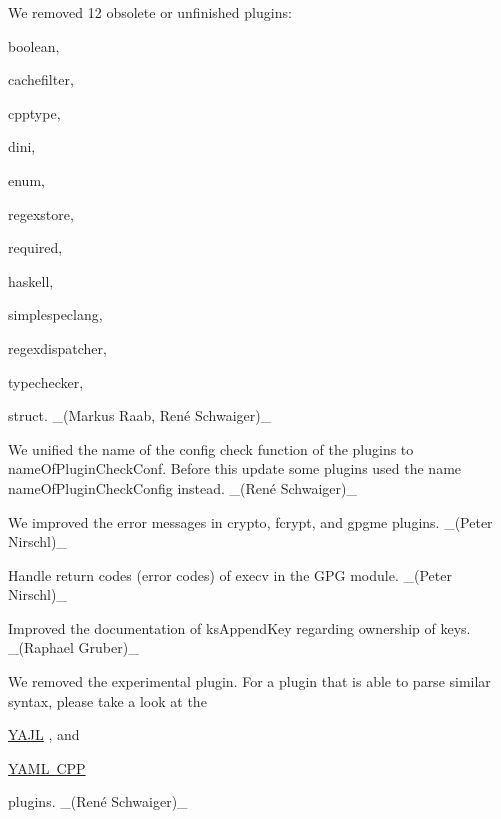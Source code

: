 \begin{DoxyItemize}
\item We removed 12 obsolete or unfinished plugins\+:
\begin{DoxyItemize}
\item {\ttfamily boolean},
\item {\ttfamily cachefilter},
\item {\ttfamily cpptype},
\item {\ttfamily dini},
\item {\ttfamily enum},
\item {\ttfamily regexstore},
\item {\ttfamily required},
\item {\ttfamily haskell},
\item {\ttfamily simplespeclang},
\item {\ttfamily regexdispatcher},
\item {\ttfamily typechecker},
\item {\ttfamily struct}. \+\_\+(Markus Raab, René Schwaiger)\+\_\+
\end{DoxyItemize}
\item We unified the name of the config check function of the plugins to {\ttfamily name\+Of\+Plugin\+Check\+Conf}. Before this update some plugins used the name {\ttfamily name\+Of\+Plugin\+Check\+Config} instead. \+\_\+(René Schwaiger)\+\_\+
\item We improved the error messages in {\ttfamily crypto}, {\ttfamily fcrypt}, and {\ttfamily gpgme} plugins. \+\_\+(\+Peter Nirschl)\+\_\+
\item Handle return codes (error codes) of {\ttfamily execv} in the G\+PG module. \+\_\+(\+Peter Nirschl)\+\_\+
\item Improved the documentation of {\ttfamily ks\+Append\+Key} regarding ownership of keys. \+\_\+(\+Raphael Gruber)\+\_\+
\end{DoxyItemize}

We removed the experimental plugin. For a plugin that is able to parse similar syntax, please take a look at the


\begin{DoxyItemize}
\item \mbox{\hyperlink{autotoc_md726_src_plugins_yajl_README_md}{Y\+A\+JL}} , and
\item \mbox{\hyperlink{autotoc_md780_src_plugins_yamlcpp_README_md}{Y\+A\+ML C\+PP}}
\end{DoxyItemize}

plugins. \+\_\+(René Schwaiger)\+\_\+



